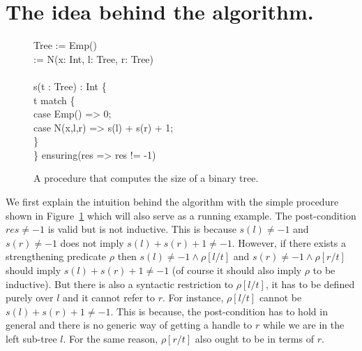 \section{The idea behind the algorithm.}

\begin{figure}
\begin{myprogram}
Tree := Emp() \\
\> \>   :=  N(x: Int, l: Tree, r: Tree) \\     
\\
s(t : Tree) : Int \{ \\
\pnl \> t match \{ \\
\pnl \> case Emp() => 0; \\
\pnl \> case N(x,l,r) => s(l) + s(r) + 1; \\
\> \} \\
\} ensuring(res => res != -1)
\end{myprogram}
\caption{A procedure that computes the size of a binary tree.} \label{fig:eg}
\end{figure}
%
We first explain the intuition behind the algorithm with the simple procedure 
shown in Figure~\ref{fig:eg} which will also serve as a running example.
The post-condition $res \ne - 1$ is valid but is not inductive. This is because
$s(l) \ne -1$  and $s(r) \ne -1$ does not imply $s(l) + s(r)  + 1 \ne -1$.
However, if there exists a strengthening predicate $\rho$ then 
$s(l) \ne -1 \wedge \rho[l/t]$  and $s(r) \ne -1 \wedge \rho[r/t]$ should 
imply $s(l) + s(r)  + 1 \ne -1$ (of course it should also imply $\rho$ to be inductive).
But there is also a syntactic restriction to $\rho[l/t]$, it has to be defined
purely over $l$ and it cannot refer to $r$. For instance, $\rho[l/t]$ cannot be 
$s(l) + s(r)  + 1 \ne -1$. 
This is because, the post-condition has to hold in general and there is no generic way
of getting a handle to $r$ while we are in the left sub-tree $l$. 
For the same reason, $\rho[r/t]$ also ought to be in terms of $r$.

